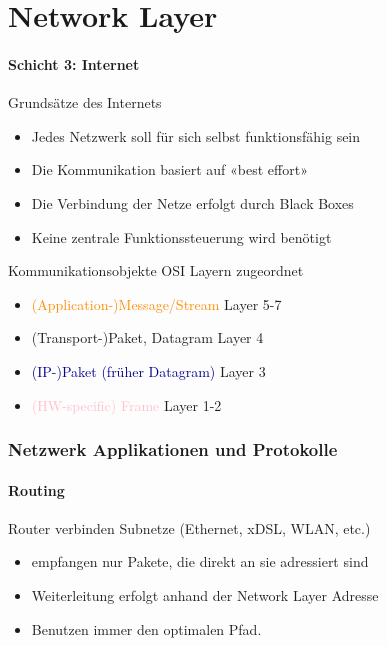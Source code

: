 \section{Network Layer}
\paragraph{Schicht 3: Internet}

\begin{concept}{Grundsätze des Internets}
    \begin{itemize}
        \item Jedes Netzwerk soll für sich selbst funktionsfähig sein
        \item Die Kommunikation basiert auf «best effort»
        \item Die Verbindung der Netze erfolgt durch Black Boxes
        \item Keine zentrale Funktionssteuerung wird benötigt
    \end{itemize}
\end{concept}

\begin{definition}{Kommunikationsobjekte} OSI Layern zugeordnet
       \begin{itemize}
        \item \textcolor{darkorange}{(Application-)Message/Stream} Layer 5-7
        \item \textcolor{darkfrog}{(Transport-)Paket, Datagram} Layer 4
        \item \textcolor{darkblue}{(IP-)Paket (früher Datagram)} Layer 3
        \item \textcolor{pink}{(HW-specific) Frame} Layer 1-2
    \end{itemize}
\end{definition}



\subsubsection{Netzwerk Applikationen und Protokolle}

\paragraph{Routing}

\begin{definition}{Router} verbinden Subnetze (Ethernet, xDSL, WLAN, etc.)
    \begin{itemize}
        \item empfangen nur Pakete, die direkt an sie adressiert sind
        \item Weiterleitung erfolgt anhand der Network Layer Adresse
        \item Benutzen immer den optimalen Pfad.
    \end{itemize}
\end{definition}
    


